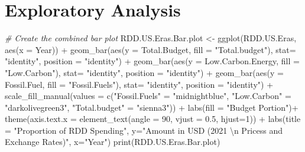 \documentclass[
  12pt,
]{article}
\newenvironment{Shaded}{\begin{snugshade}}{\end{snugshade}}
\newcommand{\AttributeTok}[1]{\textcolor[rgb]{0.77,0.63,0.00}{#1}}
\newcommand{\CommentTok}[1]{\textcolor[rgb]{0.56,0.35,0.01}{\textit{#1}}}
\newcommand{\DecValTok}[1]{\textcolor[rgb]{0.00,0.00,0.81}{#1}}
\newcommand{\FloatTok}[1]{\textcolor[rgb]{0.00,0.00,0.81}{#1}}
\newcommand{\FunctionTok}[1]{\textcolor[rgb]{0.00,0.00,0.00}{#1}}
\newcommand{\NormalTok}[1]{#1}
\newcommand{\OtherTok}[1]{\textcolor[rgb]{0.56,0.35,0.01}{#1}}
\newcommand{\SpecialCharTok}[1]{\textcolor[rgb]{0.00,0.00,0.00}{#1}}
\newcommand{\StringTok}[1]{\textcolor[rgb]{0.31,0.60,0.02}{#1}}
\begin{document}
\newpage

\hypertarget{exploratory-analysis}{%
\section{Exploratory Analysis}\label{exploratory-analysis}}

\begin{Shaded}
\begin{Highlighting}[]
\CommentTok{\# Create the combined bar plot}
\NormalTok{RDD.US.Eras.Bar.plot }\OtherTok{\textless{}{-}} \FunctionTok{ggplot}\NormalTok{(RDD.US.Eras, }\FunctionTok{aes}\NormalTok{(}\AttributeTok{x =}\NormalTok{ Year)) }\SpecialCharTok{+}
      \FunctionTok{geom\_bar}\NormalTok{(}\FunctionTok{aes}\NormalTok{(}\AttributeTok{y =}\NormalTok{ Total.Budget, }\AttributeTok{fill =} \StringTok{"Total.budget"}\NormalTok{), }\AttributeTok{stat=} \StringTok{"identity"}\NormalTok{, }\AttributeTok{position =} \StringTok{"identity"}\NormalTok{) }\SpecialCharTok{+}
  \FunctionTok{geom\_bar}\NormalTok{(}\FunctionTok{aes}\NormalTok{(}\AttributeTok{y =}\NormalTok{ Low.Carbon.Energy, }\AttributeTok{fill =} \StringTok{"Low.Carbon"}\NormalTok{), }\AttributeTok{stat=} \StringTok{"identity"}\NormalTok{, }\AttributeTok{position =} \StringTok{"identity"}\NormalTok{) }\SpecialCharTok{+}
  \FunctionTok{geom\_bar}\NormalTok{(}\FunctionTok{aes}\NormalTok{(}\AttributeTok{y =}\NormalTok{ Fossil.Fuel, }\AttributeTok{fill =} \StringTok{"Fossil.Fuels"}\NormalTok{), }\AttributeTok{stat=} \StringTok{"identity"}\NormalTok{, }\AttributeTok{position =} \StringTok{"identity"}\NormalTok{) }\SpecialCharTok{+}
  \FunctionTok{scale\_fill\_manual}\NormalTok{(}\AttributeTok{values =} \FunctionTok{c}\NormalTok{(}\StringTok{"Fossil.Fuels"} \OtherTok{=} \StringTok{"midnightblue"}\NormalTok{, }\StringTok{"Low.Carbon"} \OtherTok{=} \StringTok{"darkolivegreen3"}\NormalTok{, }\StringTok{"Total.budget"} \OtherTok{=} \StringTok{"sienna3"}\NormalTok{)) }\SpecialCharTok{+}
  \FunctionTok{labs}\NormalTok{(}\AttributeTok{fill =} \StringTok{"Budget Portion"}\NormalTok{)}\SpecialCharTok{+}
  \FunctionTok{theme}\NormalTok{(}\AttributeTok{axis.text.x =} \FunctionTok{element\_text}\NormalTok{(}\AttributeTok{angle =} \DecValTok{90}\NormalTok{, }\AttributeTok{vjust =} \FloatTok{0.5}\NormalTok{, }\AttributeTok{hjust=}\DecValTok{1}\NormalTok{)) }\SpecialCharTok{+}
  \FunctionTok{labs}\NormalTok{(}\AttributeTok{title =} \StringTok{"Proportion of RDD Spending"}\NormalTok{,}
       \AttributeTok{y=}\StringTok{"Amount in USD (2021 }\SpecialCharTok{\textbackslash{}n}\StringTok{ Pricess and Exchange Rates)"}\NormalTok{,}
       \AttributeTok{x=}\StringTok{"Year"}\NormalTok{)}
\FunctionTok{print}\NormalTok{(RDD.US.Eras.Bar.plot)}
\end{Highlighting}
\end{Shaded}
\end{document}
